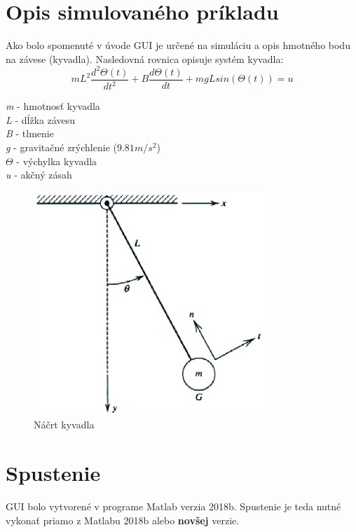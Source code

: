 \section{Opis simulovaného príkladu}
Ako bolo spomenuté v úvode GUI je určené na simuláciu a opis hmotného bodu na závese (kyvadla). Nasledovná rovnica opisuje systém kyvadla:
\begin{equation}
mL^2\frac{d^2\Theta (t)}{dt^2} + B\frac{d\Theta (t)}{dt} + mgL sin(\Theta (t)) = u
\label{eqn:kyveq}
\end{equation}
\begin{center}
	\textit{m} - hmotnosť kyvadla\\
	\textit{L} - dĺžka závesu\\
	\textit{B} - tlmenie\\
	\textit{g} - gravitačné zrýchlenie ($9.81 m/s^2$)\\
	$\Theta$ - výchylka kyvadla\\
	\textit{u} - akčný zásah
	
		\begin{figure}[h!]
		\centering
		\includegraphics[width=0.8\linewidth]{pend}
		\caption{Náčrt kyvadla}
		\label{fig:pendulum}
	\end{figure}
	
\end{center}
 
\newpage
\section{Spustenie}
GUI bolo vytvorené v programe Matlab verzia 2018b. Spustenie je teda nutné vykonať priamo z Matlabu 2018b alebo \textbf{novšej} verzie. 
